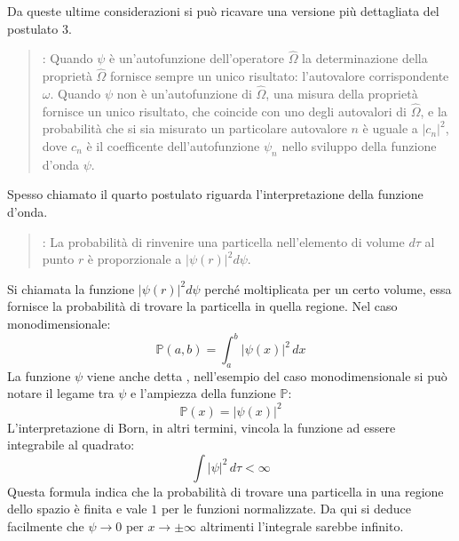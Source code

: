 Da queste ultime considerazioni si può ricavare una versione più dettagliata del postulato 3.
\begin{quote}
  : Quando $\psi$ è un'autofunzione dell'operatore $\hat{\Omega}$ la determinazione della proprietà $\hat{\Omega}$ fornisce sempre un unico risultato: l'autovalore corrispondente $\omega$. Quando $\psi$ non è un'autofunzione di $\hat{\Omega}$, una misura della proprietà fornisce un unico risultato, che coincide con uno degli autovalori di $\hat{\Omega}$, e la probabilità che si sia misurato un particolare autovalore $n$ è uguale a ${\left|c_n\right|}^2$, dove $c_n$ è il coefficente dell'autofunzione $\psi_n$ nello sviluppo della funzione d'onda $\psi$.
\end{quote}

Spesso chiamato  il quarto postulato riguarda l'interpretazione della funzione d'onda.
\begin{quote}
  : La probabilità di rinvenire una particella nell'elemento di volume $d\tau$ al punto $r$ è proporzionale a ${\left|\psi(r)\right|}^2 d\psi$.
\end{quote}
Si chiamata  la funzione ${\left|\psi(r)\right|}^2 d\psi$ perché moltiplicata per un certo volume, essa fornisce la probabilità di trovare la particella in quella regione. Nel caso monodimensionale:
$$\mathbb{P}(a, b) = \int_a^b {\left|\psi(x)\right|}^2 \, dx$$
La funzione $\psi$ viene anche detta , nell'esempio del caso monodimensionale si può notare il legame tra $\psi$ e l'ampiezza della funzione $\mathbb{P}$:
$$\mathbb{P}(x) = {\left|\psi(x)\right|}^2$$
L'interpretazione di Born, in altri termini, vincola la funzione ad essere integrabile al quadrato:
$$\int {\left|\psi\right|}^2 \, d\tau < \infty$$
Questa formula indica che la probabilità di trovare una particella in una regione dello spazio è finita e vale $1$ per le funzioni normalizzate. Da qui si deduce facilmente che $\psi \to 0$ per $ x \to \pm \infty$ altrimenti l'integrale sarebbe infinito.

